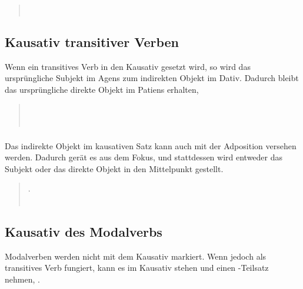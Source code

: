 \begin{quotation}
	\noindent{} \\
	\noindent{} 
\end{quotation}

\subsection{Kausativ transitiver Verben} Wenn ein transitives Verb in den Kausativ gesetzt wird, so wird das ursprüngliche Subjekt im Agens zum indirekten Objekt im Dativ. Dadurch bleibt das ursprüngliche direkte Objekt im Patiens erhalten,  \label{syn:trans-causative}

\begin{quotation}
	\noindent{} \\
	\noindent{}\\
	\indent {} 
\end{quotation}

\subsubsection{} Das indirekte Objekt im kausativen Satz kann auch mit der Adposition   versehen werden. Dadurch gerät es aus dem Fokus, und stattdessen wird entweder das Subjekt oder das direkte Objekt in den Mittelpunkt gestellt. 

\begin{quotation}
	\noindent{} .\\
	\noindent{} \\
	\indent {}
\end{quotation}

\subsection{Kausativ des Modalverbs} 
Modalverben werden nicht mit dem Kausativ markiert. Wenn jedoch   als transitives Verb fungiert, kann es im Kausativ stehen und einen -Teilsatz nehmen,  .

